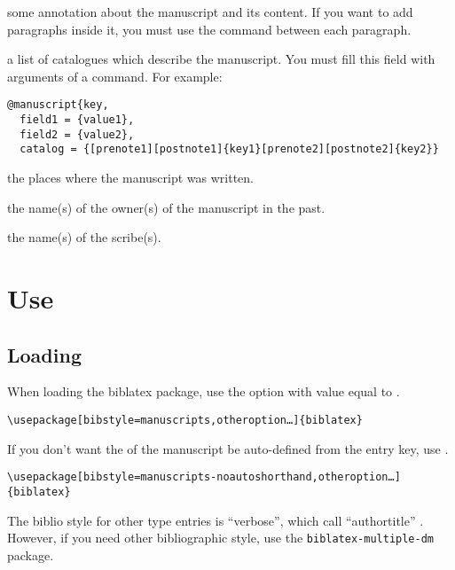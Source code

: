 \documentclass{ltxdockit}[2011/03/25]
\newcommand{\biblatex}{biblatex\xspace}
\begin{document}
\begin{fieldlist}
 some annotation about the manuscript and its content. If you want to add paragraphs inside it, you must use the  command between each paragraph.


 a list of catalogues which describe the manuscript. You must fill this field with arguments of a  command. For example:

\begin{verbatim}
@manuscript{key,
  field1 = {value1},
  field2 = {value2},
  catalog = {[prenote1][postnote1]{key1}[prenote2][postnote2]{key2}}
\end{verbatim}


 the places where the manuscript was written.

 the name(s) of the owner(s) of the manuscript in the past.

 the name(s) of the scribe(s).

\end{fieldlist}

\section{Use}
\subsection{Loading}

When loading the \biblatex package, use the option  with value equal to .

\begin{verbatim}
\usepackage[bibstyle=manuscripts,otheroption…]{biblatex}
\end{verbatim}

\label{noautoshorthand}If you don't want the  of the manuscript be auto-defined from the entry key, use .

\begin{verbatim}
\usepackage[bibstyle=manuscripts-noautoshorthand,otheroption…]{biblatex}
\end{verbatim}

The biblio style for other type entries is \enquote{verbose}, which call \enquote{authortitle} . However, if you need other bibliographic style, use the \verb+biblatex-multiple-dm+ package.
\end{document}
